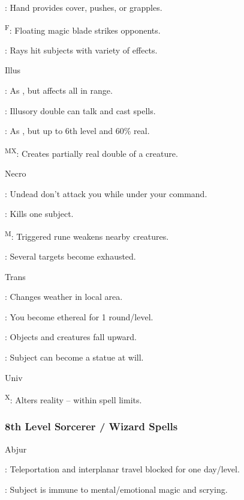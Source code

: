 : Hand provides cover, pushes, or grapples.

\textsuperscript{F}: Floating magic blade strikes opponents.

: Rays hit subjects with variety of effects.

Illus

: As , but affects all in range.

: Illusory double can talk and cast spells.

: As , but up to 6th level and 60\% real.

\textsuperscript{M}\textsuperscript{X}: Creates partially real double of a creature.

Necro

: Undead don't attack you while under your command.

: Kills one subject.

\textsuperscript{M}: Triggered rune weakens nearby creatures.

: Several targets become exhausted.

Trans

: Changes weather in local area.

: You become ethereal for 1 round/level.

: Objects and creatures fall upward.

: Subject can become a statue at will.

Univ

\textsuperscript{X}: Alters reality -- within spell limits.

\subsubsection{8th Level Sorcerer / Wizard Spells}

Abjur

: Teleportation and interplanar travel blocked for one day/level.

: Subject is immune to mental/emotional magic and scrying.

